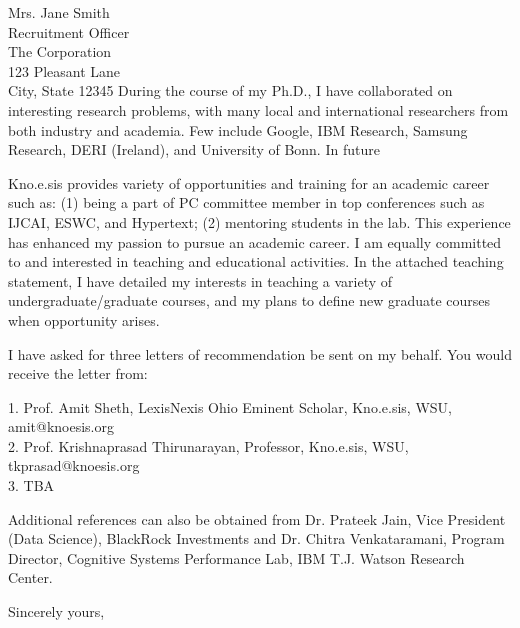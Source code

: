 \documentclass[10pt]{letter} %
\begin{document}
\begin{letter}{Mrs. Jane Smith \\
Recruitment Officer \\
The Corporation \\
123 Pleasant Lane \\
City, State 12345}
During the course of my Ph.D., I have collaborated on interesting research problems,  with many local and international researchers from both industry and academia. Few include Google, IBM Research, Samsung Research, DERI (Ireland), and University of Bonn. In future

Kno.e.sis provides variety of opportunities and training for an academic career such as: (1) being a part of PC committee member in top conferences such as IJCAI, ESWC, and Hypertext; (2) mentoring students in the lab. This experience has enhanced my passion to pursue an academic career. I am equally committed to and interested in teaching and educational activities. In the attached teaching statement, I have detailed my interests in teaching a variety of undergraduate/graduate courses, and my plans to define new graduate courses when opportunity arises. 

I have asked for three letters of recommendation be sent on my behalf. You would receive the letter from: 

1. Prof. Amit Sheth, LexisNexis Ohio Eminent Scholar, Kno.e.sis, WSU, amit@knoesis.org \\
2. Prof. Krishnaprasad Thirunarayan, Professor, Kno.e.sis, WSU, tkprasad@knoesis.org\\
3. TBA

Additional references can also be obtained from Dr. Prateek Jain, Vice President (Data Science), BlackRock Investments and Dr. Chitra Venkataramani, Program Director, Cognitive Systems Performance Lab, IBM T.J. Watson Research Center. 
\closing{Sincerely yours,}




\end{letter}
\end{document}
